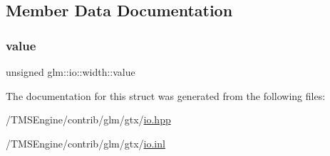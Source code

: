 \subsection{Member Data Documentation}
\mbox{\label{structglm_1_1io_1_1width_a6bf1338eb947811d36ec93bd2e9b8425}} 
\subsubsection{\texorpdfstring{value}{value}}
{\footnotesize\ttfamily unsigned glm\+::io\+::width\+::value}



The documentation for this struct was generated from the following files\+:\begin{DoxyCompactItemize}
\item 
/\+T\+M\+S\+Engine/contrib/glm/gtx/\hyperlink{io_8hpp}{io.\+hpp}\item 
/\+T\+M\+S\+Engine/contrib/glm/gtx/\hyperlink{io_8inl}{io.\+inl}\end{DoxyCompactItemize}
